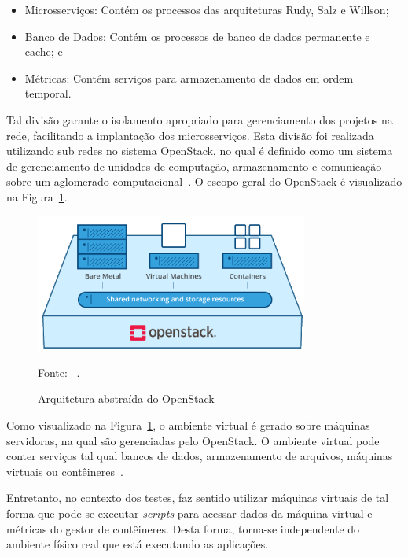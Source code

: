 \begin{itemize}
  \item Microsserviços: Contém os processos das arquiteturas Rudy, Salz e Willson;
  \item Banco de Dados: Contém os processos de banco de dados permanente e cache; e
  \item Métricas: Contém serviços para armazenamento de dados em ordem temporal.
\end{itemize}



Tal divisão garante o isolamento apropriado para gerenciamento dos projetos na rede, facilitando a implantação dos microsserviços.
%
Esta divisão foi realizada utilizando sub redes no sistema OpenStack, no qual é definido como um sistema de gerenciamento de unidades de computação, armazenamento e comunicação sobre um aglomerado computacional~\cite{open_stack_bib}.
%
O escopo geral do OpenStack é visualizado na Figura~\ref{fig:arch_open_stack}.



\begin{figure}[htb!]
  \caption{Arquitetura abstraída do OpenStack}
  \label{fig:arch_open_stack}
  \includegraphics[width=0.8\textwidth]{figuras/ambiente/openstack.png}
  \centering

  Fonte: ~\cite{open_stack_bib}.
\end{figure}



Como visualizado na Figura~\ref{fig:arch_open_stack}, o ambiente virtual é gerado sobre máquinas servidoras, na qual são gerenciadas pelo OpenStack.
%
O ambiente virtual pode conter serviços tal qual bancos de dados, armazenamento de arquivos, máquinas virtuais ou contêineres~\cite{open_stack_bib}.



Entretanto, no contexto dos testes, faz sentido utilizar máquinas virtuais de tal forma que pode-se executar \textit{scripts} para acessar dados da máquina virtual e métricas do gestor de contêineres.
%
Desta forma, torna-se independente do ambiente físico real que está executando as aplicações.



